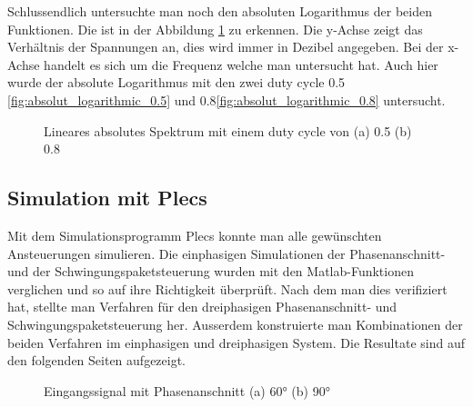 Schlussendlich untersuchte man noch den absoluten Logarithmus der beiden Funktionen. Die ist in der Abbildung \ref{fig:absolut_logaritmic_matlab} zu erkennen. Die y-Achse zeigt das Verhältnis der Spannungen an, dies wird immer in Dezibel angegeben. Bei der x-Achse handelt es sich um die Frequenz welche man untersucht hat. Auch hier wurde der absolute Logarithmus mit den zwei duty cycle 0.5 \ref{fig:absolut_logarithmic_0.5} und 0.8\ref{fig:absolut_logarithmic_0.8} untersucht.


\begin{figure}[h]
	\centering
	\qquad
	\caption{Lineares absolutes Spektrum mit einem duty cycle von (a) 0.5 (b) 0.8}
	\label{fig:absolut_logaritmic_matlab}
\end{figure}
\newpage
\subsection{Simulation mit Plecs}

Mit dem Simulationsprogramm Plecs konnte man alle gewünschten Ansteuerungen simulieren. Die einphasigen Simulationen der Phasenanschnitt- und der Schwingungspaketsteuerung wurden mit den Matlab-Funktionen verglichen und so auf ihre Richtigkeit überprüft. Nach dem man dies verifiziert hat, stellte man Verfahren für den dreiphasigen Phasenanschnitt- und Schwingungspaketsteuerung her. Ausserdem konstruierte man Kombinationen der beiden Verfahren im einphasigen und dreiphasigen System. Die Resultate sind auf den folgenden Seiten aufgezeigt.

\begin{figure}[h]
	\centering
	\qquad
	\caption{Eingangssignal mit Phasenanschnitt (a) 60° (b) 90°}
	\label{fig:Eingangssignal simuliert mit Plecs}
\end{figure}




 


